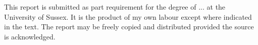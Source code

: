 This report is submitted as part requirement for the degree of ... at the University of Sussex. 
It is the product of my own labour except where indicated in the text. 
The report may be freely copied and distributed provided the source is acknowledged.
